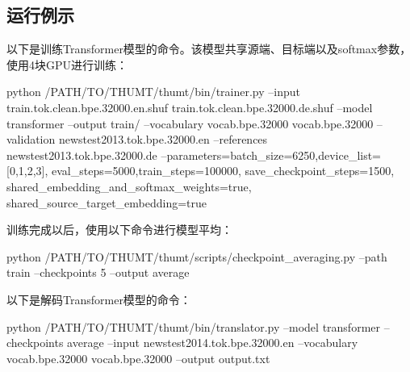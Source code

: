 \documentclass{article}
\begin{document}
\subsection{运行例示}
以下是训练Transformer模型的命令。该模型共享源端、目标端以及softmax参数，使用4块GPU进行训练：
\begin{everbatim}
python /PATH/TO/THUMT/thumt/bin/trainer.py 
  --input train.tok.clean.bpe.32000.en.shuf 
          train.tok.clean.bpe.32000.de.shuf 
  --model transformer --output train/ 
  --vocabulary vocab.bpe.32000 vocab.bpe.32000 
  --validation newstest2013.tok.bpe.32000.en 
  --references newstest2013.tok.bpe.32000.de 
  --parameters=batch_size=6250,device_list=[0,1,2,3],
               eval_steps=5000,train_steps=100000,
               save_checkpoint_steps=1500,
               shared_embedding_and_softmax_weights=true,
               shared_source_target_embedding=true
\end{everbatim}
训练完成以后，使用以下命令进行模型平均：
\begin{everbatim}
python /PATH/TO/THUMT/thumt/scripts/checkpoint_averaging.py
  --path train --checkpoints 5 --output average
\end{everbatim}
以下是解码Transformer模型的命令：
\begin{everbatim}
python /PATH/TO/THUMT/thumt/bin/translator.py 
  --model transformer 
  --checkpoints average 
  --input newstest2014.tok.bpe.32000.en 
  --vocabulary vocab.bpe.32000 vocab.bpe.32000 
  --output output.txt 
\end{everbatim}



\end{document}
